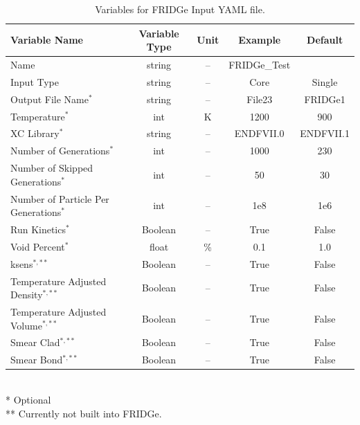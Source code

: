 \documentclass{article}
\begin{document}
\begin{table}
	\centering
	\caption{Variables for FRIDGe Input YAML file.}
	\begin{tabular}{lcccc}\toprule
		Variable Name   & Variable Type & Unit & Example & Default 
		\\
		\hline
    	Name  & string & -- & FRIDGe\_Test & 
		\\
    	Input Type  & string & -- & Core & Single
		\\
    	Output File Name$^*$  & string & -- & File23 & FRIDGe1
		\\				
		Temperature$^*$ & int & K & 1200 & 900
		\\		
		XC Library$^*$ & string & -- & ENDFVII.0 & ENDFVII.1
		\\
		Number of Generations$^*$ & int & -- & 1000 & 230
		\\
		Number of Skipped Generations$^*$ & int & -- & 50 & 30
		\\	
		Number of Particle Per Generations$^*$ & int & -- & 1e8 & 1e6
		\\			
	    Run Kinetics$^*$ & Boolean & -- & True & False
		\\
		Void Percent$^*$ & float & \% & 0.1 & 1.0
		\\	
	    ksens$^{*,**}$ & Boolean & -- & True & False
		\\
	    Temperature Adjusted Density$^{*,**}$ & Boolean & -- & True & False
		\\
	    Temperature Adjusted Volume$^{*,**}$ & Boolean& -- & True & False
		\\
	    Smear Clad$^{*,**}$ & Boolean & -- & True & False
		\\	
	    Smear Bond$^{*,**}$ & Boolean & -- & True & False
		\\
		\bottomrule
	\end{tabular}
	\\
	* Optional
	\\
	** Currently not built into FRIDGe.
	\label{tab:input}
\end{table}
\end{document}
